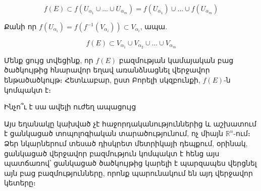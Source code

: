 \documentclass[12pt, a4paper]{article}
\begin{document}
$$f(E) \subset f(U_{\alpha_1} \cup \dots \cup U_{\alpha_m}) = f(U_{\alpha_1}) \cup \dots \cup f(U_{\alpha_m})$$

Քանի որ $f(U_{\alpha_i}) = f(f^{-1}(V_{\alpha_i})) \subset V_{\alpha_i}$, ապա.

$$f(E) \subset V_{\alpha_1} \cup V_{\alpha_2} \cup \dots \cup V_{\alpha_m}$$

Մենք ցույց տվեցինք, որ $f(E)$ բազմության կամայական բաց ծածկույթից հնարավոր եղավ առանձնացնել վերջավոր ենթածածկույթ։ Հետևաբար, ըստ Բորելի սկզբունքի, $f(E)$-ն կոմպակտ է։

Ինչո՞ւ է սա ավելի ուժեղ ապացույց

Այս եղանակը կախված չէ հաջորդականություններից և աշխատում է ցանկացած տոպոլոգիական տարածությունում, ոչ միայն $\mathbb{R}^n$-ում։ Ձեր նկարներում տեսած դիսկրետ մետրիկայի դեպքում, օրինակ, ցանկացած վերջավոր բազմություն կոմպակտ է հենց այս պատճառով՝ ցանկացած ծածկույթից կարելի է պարզապես վերցնել այն բաց բազմությունները, որոնք պարունակում են այդ վերջավոր կետերը։
\end{document}
